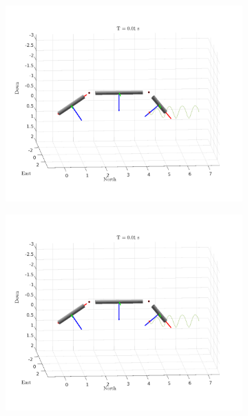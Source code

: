 \begin{figure}[h!]
    \centering
    \begin{subfigure}[b]{0.45\linewidth}
        \includegraphics[page=1,width=\linewidth]{assets/results/kinematic/gif.pdf}
    \end{subfigure}
    \begin{subfigure}[b]{0.45\linewidth}
        \includegraphics[page=2,width=\linewidth]{assets/results/kinematic/gif.pdf}
    \end{subfigure}
    \begin{subfigure}[b]{0.45\linewidth}

\end{subfigure}
\end{figure}
